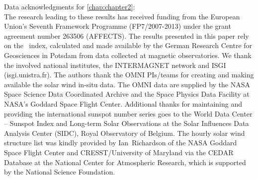 Data acknowledgments for \autoref{chap:chapter2}:\\
The research leading to these results has received funding from the European Union's Seventh Framework Programme (FP7/2007-2013) under the grant agreement number 263506 (AFFECTS). The results presented in this paper rely on the \Kp{}~index, calculated and made available by the German Research Centre for Geosciences in Potsdam from data collected at magnetic observatories. We thank the involved national institutes, the INTERMAGNET network and ISGI (isgi.unistra.fr). The authors thank the OMNI PIs/teams for creating and making available the solar wind in-situ data. The OMNI data are supplied by the NASA Space Science Data Coordinated Archive and the Space Physics Data Facility at NASA's Goddard Space Flight Center. Additional thanks for maintaining and providing the international sunspot number series goes to the World Data Center -- Sunspot Index and Long-term Solar Observations at the Solar Influences Data Analysis Center (SIDC), Royal Observatory of Belgium. The hourly solar wind structure list was kindly provided by Ian~Richardson of the NASA Goddard Space Flight Center and CRESST/University of Maryland via the CEDAR Database at the National Center for Atmospheric Research, which is supported by the National Science Foundation.


